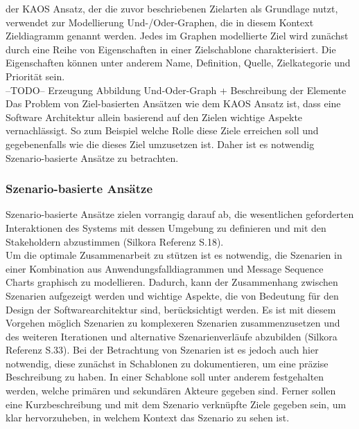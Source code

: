 der KAOS Ansatz, der die zuvor beschriebenen Zielarten als Grundlage nutzt, verwendet zur Modellierung Und-/Oder-Graphen, die in diesem Kontext Zieldiagramm genannt werden. Jedes im Graphen modellierte Ziel wird zun\"achst durch eine Reihe von Eigenschaften in einer Zielschablone charakterisiert. Die Eigenschaften k\"onnen unter anderem Name, Definition, Quelle, Zielkategorie und Priorit\"at sein.\\

--TODO-- Erzeugung Abbildung Und-Oder-Graph + Beschreibung der Elemente\\

Das Problem von Ziel-basierten Ans\"atzen wie dem KAOS Ansatz ist, dass eine Software Architektur allein basierend auf den Zielen wichtige Aspekte vernachl\"assigt. So zum Beispiel welche Rolle diese Ziele erreichen soll und gegebenenfalls wie die dieses Ziel umzusetzen ist. Daher ist es notwendig Szenario-basierte Ans\"atze zu betrachten.\\

\subsubsection{Szenario-basierte Ans\"atze}
Szenario-basierte Ans\"atze zielen vorrangig darauf ab, die wesentlichen geforderten Interaktionen des Systems mit dessen Umgebung zu definieren und mit den Stakeholdern abzustimmen (Silkora Referenz S.18).\\

Um die optimale Zusammenarbeit zu st\"utzen ist es notwendig, die Szenarien in einer Kombination aus Anwendungsfalldiagrammen und Message Sequence Charts graphisch zu modellieren. Dadurch, kann der Zusammenhang zwischen Szenarien aufgezeigt werden und wichtige Aspekte, die von Bedeutung f\"ur den Design der Softwarearchitektur sind, ber\"ucksichtigt werden. Es ist mit diesem Vorgehen m\"oglich Szenarien zu komplexeren Szenarien zusammenzusetzen und des weiteren Iterationen und alternative Szenarienverl\"aufe abzubilden (Silkora Referenz S.33). Bei der Betrachtung von Szenarien ist es jedoch auch hier notwendig, diese zun\"achst in Schablonen zu dokumentieren, um eine pr\"azise Beschreibung zu haben. In einer Schablone soll unter anderem festgehalten werden, welche prim\"aren und sekund\"aren Akteure gegeben sind. Ferner sollen eine Kurzbeschreibung und mit dem Szenario verkn\"upfte Ziele gegeben sein, um klar hervorzuheben, in welchem Kontext das Szenario zu sehen ist.\\

